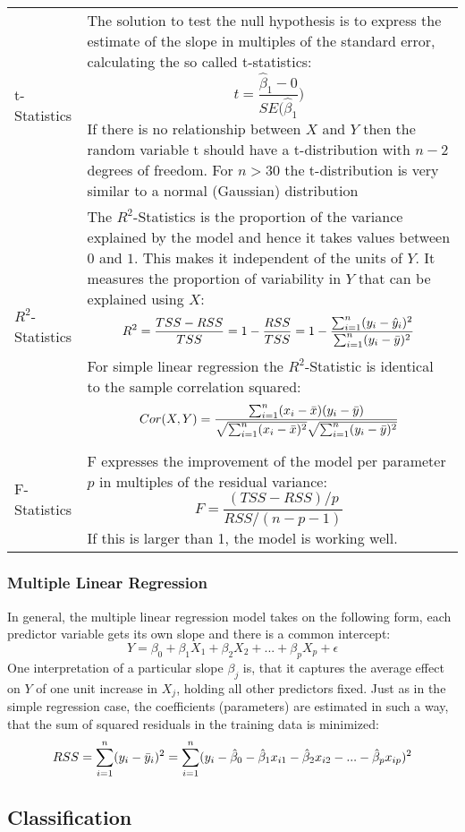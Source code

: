 \begin{onehalfspace}
	\begin{tabularx}{\textwidth}{p{3cm}X}
		t-Statistics & The solution to test the null hypothesis is to express the estimate of the slope in multiples of the
		standard error, calculating the so called t-statistics: \[ t = \frac{\hat{\beta}_1 - 0}{SE(\hat{\beta}_1}) \]
		If there is no relationship between $X$ and $Y$ then the random variable t should have a t-distribution with
		$n-2$ degrees of freedom. For $n>30$ the t-distribution is very similar to a normal (Gaussian) distribution\\
		$R^2$-Statistics & The $R^2$-Statistics is the proportion of the variance explained by the model and hence it takes
		values between $0$ and $1$. This makes it independent of the units of $Y$. It measures the proportion of variability
		in $Y$ that can be explained using $X$: 
		\[ R^2=\frac{TSS-RSS}{TSS}=1-\frac{RSS}{TSS}=1-\frac{\sum_{i=1}^{n} (y_i-\hat{y}_i)^2}{\sum_{i=1}^{n} (y_i-\bar{y})^2} \] 
		For simple linear regression the $R^2$-Statistic is identical to the sample correlation squared:
		\[ Cor(X,Y)=\frac{\sum_{i=1}^{n} (x_i-\bar{x})(y_i-\bar{y})}{\sqrt{\sum_{i=1}^{n} (x_i-\bar{x})^2}\sqrt{\sum_{i=1}^{n} (y_i-\bar{y})^2}} \]
		\\
		F-Statistics & F expresses the improvement of the model per parameter $p$ in multiples of the residual variance:
		\[ F=\frac{(TSS-RSS)/p}{RSS/(n-p-1)} \]
		If this is larger than 1, the model is working well.
	\end{tabularx}
\end{onehalfspace}

\subsubsection{Multiple Linear Regression}
In general, the multiple linear regression model takes on the following form, 
each predictor variable gets its own slope and there is a common intercept:
\[ Y=\beta_0+\beta_1X_1+\beta_2X_2+...+\beta_pX_p+\epsilon \]
One interpretation of a particular slope $\beta_j$ is, that it captures the average effect on $Y$ of one unit increase in $X_j$,
holding all other predictors fixed. Just as in the simple regression case, the coefficients (parameters) are estimated in such
a way, that the sum of squared residuals in the training data is minimized:
\[ RSS=\sum_{i=1}^{n}(y_i-\bar{y}_i)^2=\sum_{i=1}^{n}(y_i-\hat{\beta}_0-\hat{\beta}_1x_{i1}-\hat{\beta}_2x_{i2}-...-\hat{\beta}_px_{ip})^2 \]



\subsection{Classification}
